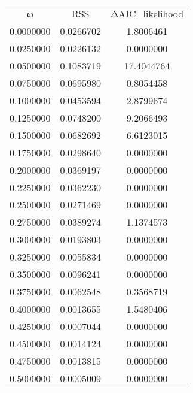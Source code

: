 \begin{tabular}{ccc}
ω & RSS & ΔAIC_likelihood\\
0.0000000 & 0.0266702 & 1.8006461\\
0.0250000 & 0.0226132 & 0.0000000\\
0.0500000 & 0.1083719 & 17.4044764\\
0.0750000 & 0.0695980 & 0.8054458\\
0.1000000 & 0.0453594 & 2.8799674\\
0.1250000 & 0.0748200 & 9.2066493\\
0.1500000 & 0.0682692 & 6.6123015\\
0.1750000 & 0.0298640 & 0.0000000\\
0.2000000 & 0.0369197 & 0.0000000\\
0.2250000 & 0.0362230 & 0.0000000\\
0.2500000 & 0.0271469 & 0.0000000\\
0.2750000 & 0.0389274 & 1.1374573\\
0.3000000 & 0.0193803 & 0.0000000\\
0.3250000 & 0.0055834 & 0.0000000\\
0.3500000 & 0.0096241 & 0.0000000\\
0.3750000 & 0.0062548 & 0.3568719\\
0.4000000 & 0.0013655 & 1.5480406\\
0.4250000 & 0.0007044 & 0.0000000\\
0.4500000 & 0.0014124 & 0.0000000\\
0.4750000 & 0.0013815 & 0.0000000\\
0.5000000 & 0.0005009 & 0.0000000\\
\end{tabular}
